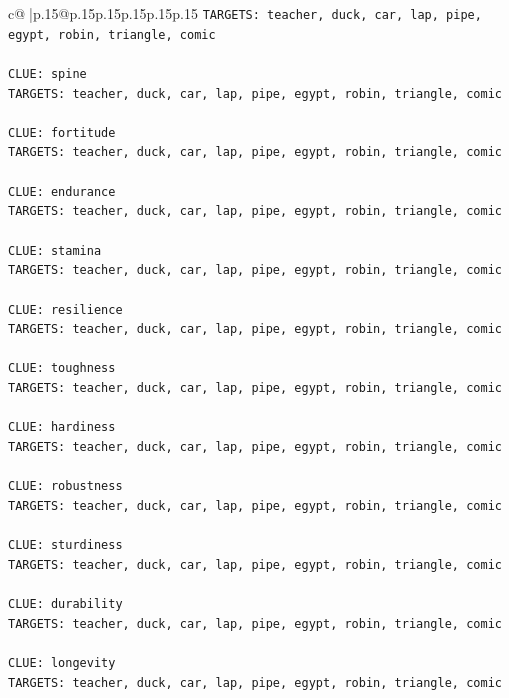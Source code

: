 \documentclass{article}
\begin{document}
{\begin{supertabular}{c@{$\;$}|p{.15\linewidth}@{}p{.15\linewidth}p{.15\linewidth}p{.15\linewidth}p{.15\linewidth}p{.15\linewidth}}
{{{\texttt{TARGETS: teacher, duck, car, lap, pipe, egypt, robin, triangle, comic} \\
\\ 
\texttt{CLUE: spine} \\
\texttt{TARGETS: teacher, duck, car, lap, pipe, egypt, robin, triangle, comic} \\
\\ 
\texttt{CLUE: fortitude} \\
\texttt{TARGETS: teacher, duck, car, lap, pipe, egypt, robin, triangle, comic} \\
\\ 
\texttt{CLUE: endurance} \\
\texttt{TARGETS: teacher, duck, car, lap, pipe, egypt, robin, triangle, comic} \\
\\ 
\texttt{CLUE: stamina} \\
\texttt{TARGETS: teacher, duck, car, lap, pipe, egypt, robin, triangle, comic} \\
\\ 
\texttt{CLUE: resilience} \\
\texttt{TARGETS: teacher, duck, car, lap, pipe, egypt, robin, triangle, comic} \\
\\ 
\texttt{CLUE: toughness} \\
\texttt{TARGETS: teacher, duck, car, lap, pipe, egypt, robin, triangle, comic} \\
\\ 
\texttt{CLUE: hardiness} \\
\texttt{TARGETS: teacher, duck, car, lap, pipe, egypt, robin, triangle, comic} \\
\\ 
\texttt{CLUE: robustness} \\
\texttt{TARGETS: teacher, duck, car, lap, pipe, egypt, robin, triangle, comic} \\
\\ 
\texttt{CLUE: sturdiness} \\
\texttt{TARGETS: teacher, duck, car, lap, pipe, egypt, robin, triangle, comic} \\
\\ 
\texttt{CLUE: durability} \\
\texttt{TARGETS: teacher, duck, car, lap, pipe, egypt, robin, triangle, comic} \\
\\ 
\texttt{CLUE: longevity} \\
\texttt{TARGETS: teacher, duck, car, lap, pipe, egypt, robin, triangle, comic} \\
}}}
\end{supertabular}}
\end{document}
